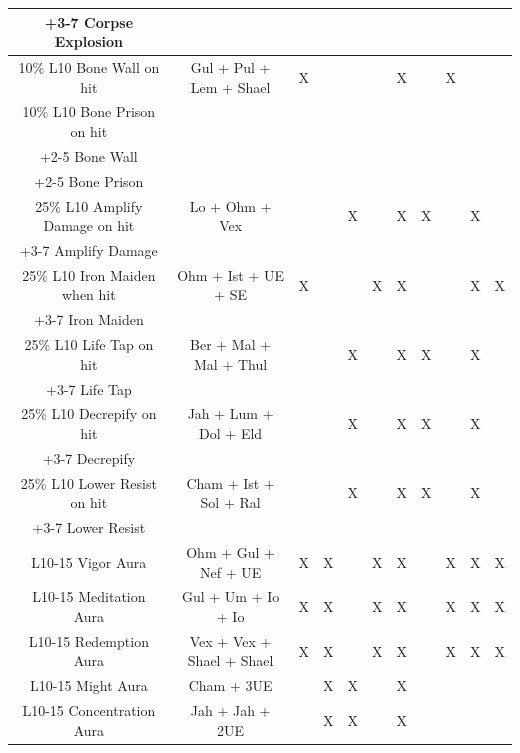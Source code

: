 \documentclass[12pt,a4paper]{article}
\begin{document}
\begin{center}
{\begin{tabular}{|c|c|c|c|c|c|c|c|c|c|c|}
+3-7 Corpse Explosion&&&&&&&&&&\\
\hline
10\% L10 Bone Wall on hit&Gul + Pul + Lem + Shael&X&&&&X&&X&&\\
10\% L10 Bone Prison on hit&&&&&&&&&&\\
+2-5 Bone Wall&&&&&&&&&&\\
+2-5 Bone Prison&&&&&&&&&&\\
\hline
25\% L10 Amplify Damage on hit&Lo + Ohm + Vex&&&X&&X&X&&X&\\
+3-7 Amplify Damage&&&&&&&&&&\\
\hline
25\% L10 Iron Maiden when hit&Ohm + Ist + UE + SE&X&&&X&X&&&X&X\\
+3-7 Iron Maiden&&&&&&&&&&\\
\hline
25\% L10 Life Tap on hit&Ber + Mal + Mal + Thul&&&X&&X&X&&X&\\
+3-7 Life Tap&&&&&&&&&&\\
\hline
25\% L10 Decrepify on hit&Jah + Lum + Dol + Eld&&&X&&X&X&&X&\\
+3-7 Decrepify&&&&&&&&&&\\
\hline
25\% L10 Lower Resist on hit&Cham + Ist + Sol + Ral&&&X&&X&X&&X&\\
+3-7 Lower Resist&&&&&&&&&&\\
\hline
L10-15 Vigor Aura&Ohm + Gul + Nef + UE&X&X&&X&X&&X&X&X\\
\hline
L10-15 Meditation Aura&Gul + Um + Io + Io&X&X&&X&X&&X&X&X\\
\hline
L10-15 Redemption Aura&Vex + Vex + Shael + Shael&X&X&&X&X&&X&X&X\\
\hline
L10-15 Might Aura&Cham + 3UE&&X&X&&X&&&&\\
\hline
L10-15 Concentration Aura&Jah + Jah + 2UE&&X&X&&X&&&&\\
\hline
\end{tabular}
}
\end{center}
\end{document}
